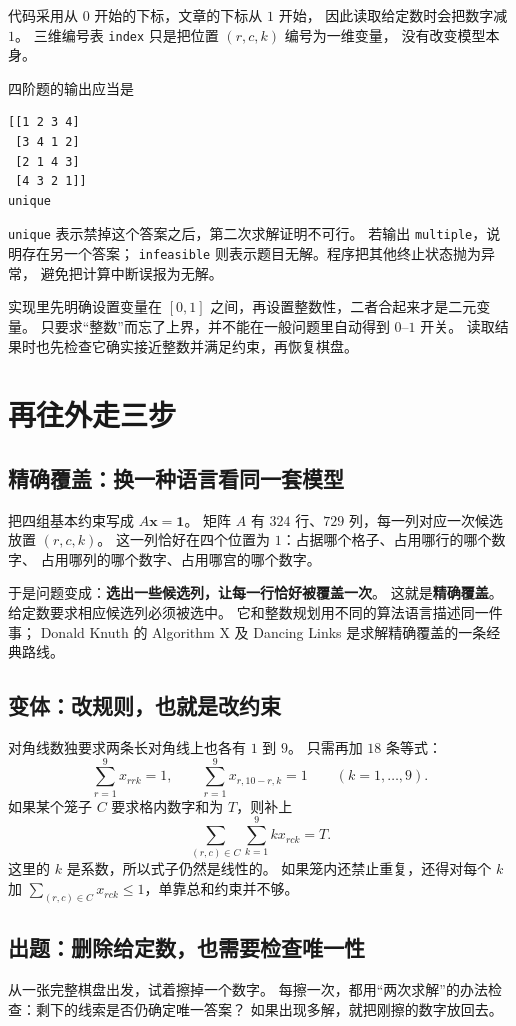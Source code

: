 \documentclass[UTF8,11pt,fontset=none]{ctexart}
\begin{document}
代码采用从 $0$ 开始的下标，文章的下标从 $1$ 开始，
因此读取给定数时会把数字减 $1$。
三维编号表 \texttt{index} 只是把位置 $(r,c,k)$ 编号为一维变量，
没有改变模型本身。

四阶题的输出应当是
\begin{lstlisting}
[[1 2 3 4]
 [3 4 1 2]
 [2 1 4 3]
 [4 3 2 1]]
unique
\end{lstlisting}
\texttt{unique} 表示禁掉这个答案之后，第二次求解证明不可行。
若输出 \texttt{multiple}，说明存在另一个答案；
\texttt{infeasible} 则表示题目无解。程序把其他终止状态抛为异常，
避免把计算中断误报为无解。

实现里先明确设置变量在 $[0,1]$ 之间，再设置整数性，二者合起来才是二元变量。
只要求“整数”而忘了上界，并不能在一般问题里自动得到 $0$--$1$ 开关。
读取结果时也先检查它确实接近整数并满足约束，再恢复棋盘。

\section{再往外走三步}
\subsection{精确覆盖：换一种语言看同一套模型}
把四组基本约束写成 $A\boldsymbol{x}=\boldsymbol{1}$。
矩阵 $A$ 有 $324$ 行、$729$ 列，每一列对应一次候选放置 $(r,c,k)$。
这一列恰好在四个位置为 $1$：占据哪个格子、占用哪行的哪个数字、
占用哪列的哪个数字、占用哪宫的哪个数字。

于是问题变成：\textbf{选出一些候选列，让每一行恰好被覆盖一次}。
这就是\textbf{精确覆盖}。给定数要求相应候选列必须被选中。
它和整数规划用不同的算法语言描述同一件事；
Donald Knuth 的 Algorithm X 及 Dancing Links 是求解精确覆盖的一条经典路线。

\subsection{变体：改规则，也就是改约束}
对角线数独要求两条长对角线上也各有 $1$ 到 $9$。
只需再加 $18$ 条等式：
\[
\sum_{r=1}^9x_{rrk}=1,\qquad
\sum_{r=1}^9x_{r,10-r,k}=1\qquad(k=1,\dots,9).
\]
如果某个笼子 $C$ 要求格内数字和为 $T$，则补上
\[
\sum_{(r,c)\in C}\sum_{k=1}^9 kx_{rck}=T.
\]
这里的 $k$ 是系数，所以式子仍然是线性的。
如果笼内还禁止重复，还得对每个 $k$ 加
$\sum_{(r,c)\in C}x_{rck}\le1$，单靠总和约束并不够。

\subsection{出题：删除给定数，也需要检查唯一性}
从一张完整棋盘出发，试着擦掉一个数字。
每擦一次，都用“两次求解”的办法检查：剩下的线索是否仍确定唯一答案？
如果出现多解，就把刚擦的数字放回去。
\end{document}
